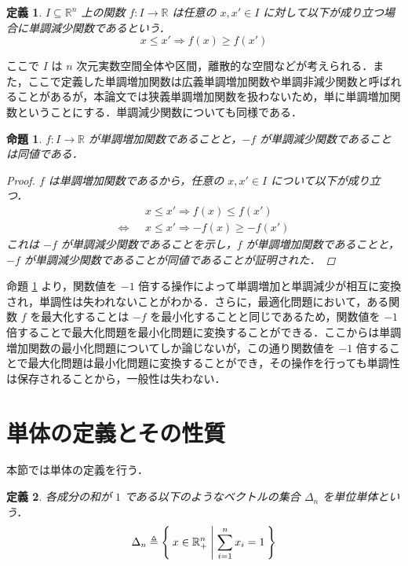 \documentclass[a4paper,11pt]{jreport}
\newtheorem{definition}{定義}
\newtheorem{proposition}{命題}
\begin{document}
\begin{definition}
$ I \subseteq \mathbb{R}^n $ 上の関数 $ f : I \to \mathbb{R} $ は任意の $ x, x' \in I $ に対して以下が成り立つ場合に単調減少関数であるという．
$$ x \leq x' \Rightarrow f(x) \geq f(x') $$
\end{definition}

ここで $ I $ は $ n $ 次元実数空間全体や区間，離散的な空間などが考えられる．また，ここで定義した単調増加関数は広義単調増加関数や単調非減少関数と呼ばれることがあるが，本論文では狭義単調増加関数を扱わないため，単に単調増加関数ということにする．単調減少関数についても同様である．

\begin{proposition} \label{prop:keeping_monotonicity}
$ f : I \to \mathbb{R} $ が単調増加関数であることと，$ -f $ が単調減少関数であることは同値である．

\begin{proof}
$ f $ は単調増加関数であるから，任意の $ x, x' \in I $ について以下が成り立つ．
\begin{align*}
& x \leq x' \Rightarrow f(x) \leq f(x') \\
\Longleftrightarrow \hspace{8pt} & x \leq x' \Rightarrow -f(x) \geq -f(x')
\end{align*}
これは $ -f $ が単調減少関数であることを示し，$ f $ が単調増加関数であることと，$ -f $ が単調減少関数であることが同値であることが証明された．
\end{proof}

\end{proposition}

命題 \ref{prop:keeping_monotonicity} より，関数値を $ -1 $ 倍する操作によって単調増加と単調減少が相互に変換され，単調性は失われないことがわかる．さらに，最適化問題において，ある関数 $ f $ を最大化することは $ -f $ を最小化することと同じであるため，関数値を $ -1 $ 倍することで最大化問題を最小化問題に変換することができる．ここからは単調増加関数の最小化問題についてしか論じないが，この通り関数値を $ -1 $ 倍することで最大化問題は最小化問題に変換することができ，その操作を行っても単調性は保存されることから，一般性は失わない．\par

\section{単体の定義とその性質}

本節では単体の定義を行う．

\begin{definition}
各成分の和が $ 1 $ である以下のようなベクトルの集合 $ \Delta_n $ を単位単体という．
$$ \Delta_n \triangleq \Set{ x \in \mathbb{R}^n_{+} | \sum_{i=1}^{n} x_i = 1 } $$
\end{definition}
\end{document}
